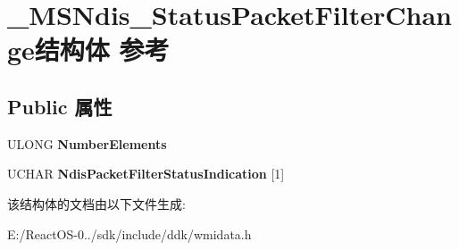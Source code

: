 \hypertarget{struct___m_s_ndis___status_packet_filter_change}{}\section{\+\_\+\+M\+S\+Ndis\+\_\+\+Status\+Packet\+Filter\+Change结构体 参考}
\label{struct___m_s_ndis___status_packet_filter_change}
\subsection*{Public 属性}
\begin{DoxyCompactItemize}
\item 
\mbox{\label{struct___m_s_ndis___status_packet_filter_change_acd5f0b426d11d2754eced1d44969ed52}} 
U\+L\+O\+NG {\bfseries Number\+Elements}
\item 
\mbox{\label{struct___m_s_ndis___status_packet_filter_change_a60d459b9138074686666eb4c6c3de78e}} 
U\+C\+H\+AR {\bfseries Ndis\+Packet\+Filter\+Status\+Indication} \mbox{[}1\mbox{]}
\end{DoxyCompactItemize}


该结构体的文档由以下文件生成\+:\begin{DoxyCompactItemize}
\item 
E\+:/\+React\+O\+S-\/0../sdk/include/ddk/wmidata.\+h\end{DoxyCompactItemize}
